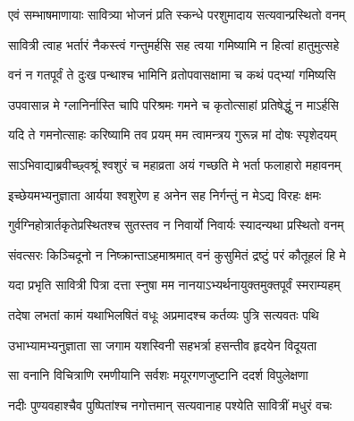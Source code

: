 \begin{center}
\twolineshloka
{एवं सम्भाषमाणायाः सावित्र्या भोजनं प्रति}
{स्कन्धे परशुमादाय सत्यवान्प्रस्थितो वनम्}


\twolineshloka
{सावित्री त्वाह भर्तारं नैकस्त्वं गन्तुमर्हसि}
{सह त्वया गमिष्यामि न हित्वां हातुमुत्सहे}




\twolineshloka
{वनं न गतपूर्वं ते दुःख पन्थाश्च भामिनि}
{व्रतोपवासक्षामा च कथं पद्भ्यां गमिष्यसि}




\twolineshloka
{उपवासान्न मे ग्लानिर्नास्ति चापि परिश्रमः}
{गमने च कृतोत्साहां प्रतिषेद्धुं न माऽर्हसि}




\twolineshloka
{यदि ते गमनोत्साहः करिष्यामि तव प्रयम्}
{मम त्वामन्त्रय गुरून्न मां दोषः स्पृशेदयम्}




\twolineshloka
{साऽभिवाद्याब्रवीच्छ्वश्रूं श्वशुरं च महाव्रता}
{अयं गच्छति मे भर्ता फलाहारो महावनम्}


\twolineshloka
{इच्छेयमभ्यनुज्ञाता आर्यया श्वशुरेण ह}
{अनेन सह निर्गन्तुं न मेऽद्य विरहः क्षमः}


\twolineshloka
{गुर्वग्निहोत्रार्तकृतेप्रस्थितश्च सुतस्तव}
{न निवार्यो निवार्यः स्यादन्यथा प्रस्थितो वनम्}


\twolineshloka
{संवत्सरः किञ्चिदूनो न निष्क्रान्ताऽहमाश्रमात्}
{वनं कुसुमितं द्रष्टुं परं कौतूहलं हि मे}




\twolineshloka
{यदा प्रभृति सावित्री पित्रा दत्ता स्नुषा मम}
{नानयाऽभ्यर्थनायुक्तमुक्तपूर्वं स्मराम्यहम्}


\twolineshloka
{तदेषा लभतां कामं यथाभिलषितं वधूः}
{अप्रमादश्च कर्तव्यः पुत्रि सत्यवतः पथि}




\twolineshloka
{उभाभ्यामभ्यनुज्ञाता सा जगाम यशस्विनी}
{सहभर्त्रा हसन्तीव हृदयेन विदूयता}


\twolineshloka
{सा वनानि विचित्राणि रमणीयानि सर्वशः}
{मयूरगणजुष्टानि ददर्श विपुलेक्षणा}


\twolineshloka
{नदीः पुण्यवहाश्चैव पुष्पितांश्च नगोत्तमान्}
{सत्यवानाह पश्येति सावित्रीं मधुरं वचः}



\end{center}
